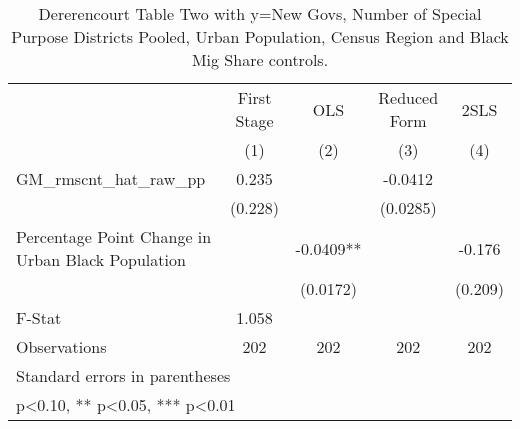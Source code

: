 \begin{table}[htbp]\centering
\def\sym#1{\ifmmode^{#1}\else\(^{#1}\)\fi}
\caption{Dererencourt Table Two with y=New Govs, Number of Special Purpose Districts Pooled, Urban Population, Census Region and Black Mig Share controls.}
\begin{tabular}{l*{4}{c}}
\toprule
                    & First Stage   &         OLS   &Reduced Form   &        2SLS   \\
                    &\multicolumn{1}{c}{(1)}   &\multicolumn{1}{c}{(2)}   &\multicolumn{1}{c}{(3)}   &\multicolumn{1}{c}{(4)}   \\
\midrule
GM\_rmscnt\_hat\_raw\_pp&       0.235   &               &     -0.0412   &               \\
                    &     (0.228)   &               &    (0.0285)   &               \\
\addlinespace
Percentage Point Change in Urban Black Population&               &     -0.0409** &               &      -0.176   \\
                    &               &    (0.0172)   &               &     (0.209)   \\
\midrule
F-Stat              &       1.058   &               &               &               \\
Observations        &         202   &         202   &         202   &         202   \\
\bottomrule
\multicolumn{5}{l}{\footnotesize Standard errors in parentheses}\\
\multicolumn{5}{l}{\footnotesize * p<0.10, ** p<0.05, *** p<0.01}\\
\end{tabular}
\end{table}
